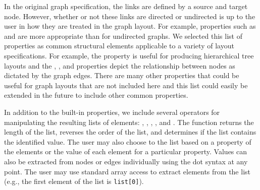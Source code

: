 In the original graph specification, the links are defined by a source
and target node. However, whether or not these links are
directed or undirected is up to the user in how they
are treated in the graph layout. For example, properties such as
 and  are more appropriate than 
for undirected graphs. We selected this list of properties as common structural elements
applicable to a variety of layout specifications. For example, the 
property is useful for producing hierarchical tree layouts and the 
, , and  properties
depict the relationship between nodes as dictated by the graph edges. 
There are many other properties that could be useful for graph layouts that are not included 
here and this list could easily be extended in the future to include other
common properties.

In addition to the built-in properties, we include several operators for 
manipulating the resulting lists of elements: , ,
, , and . The function 
 returns the length of the list,  
reverses the order of the list, and  determines if
the list contains the identified value. The user may also choose to  
the list based on a property of the elements or  the value of each
element for a particular property. Values can also be extracted from
nodes or edges individually using the dot syntax at any point. The user may use standard
array access to extract elements from the list (e.g., the first element of
the list is \texttt{list[0]}).



